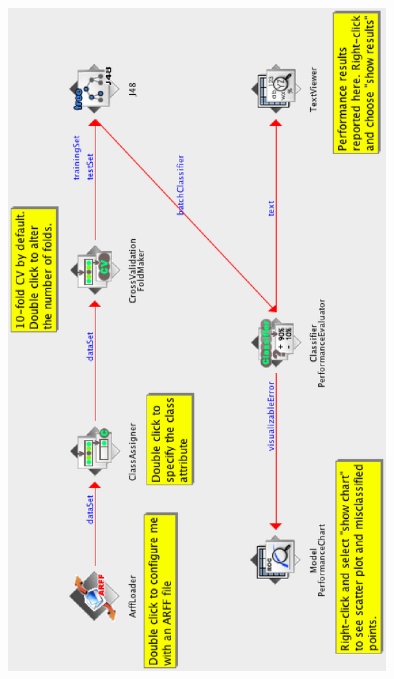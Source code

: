 \begin{center}
  \includegraphics[angle=270,width=10cm]{images/knowledgeflow/example_j48.eps}
\end{center}


